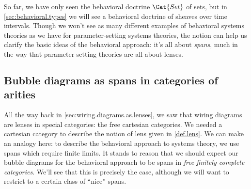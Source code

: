 \documentclass[DynamicalBook]{subfiles}
\begin{document}
So far, we have only seen the behavioral doctrine $\Cat{Set}$ of sets, but in
\cref{sec:behavioral.types} we will see a behavioral doctrine of sheaves over
time intervals. Though we won't see as many different examples of behavioral
systems theories as we have for parameter-setting systems theories, the notion can help us
clarify the basic ideas of the behavioral approach: it's all about \emph{spans},
much in the way that parameter-setting theories are all about lenses.

\subsection{Bubble diagrams as spans in categories of arities}\label{sec:behavioral.diagrams}


All the way back in \cref{sec:wiring.diagrams.as.lenses}, we saw that wiring
diagrams are lenses in special categories: the free cartesian categories. We
needed a cartesian category to describe the notion of lens given in
\cref{def.lens}. We can make an analogy here: to describe the behavioral
approach to systems theory, we use spans which require finite limits. It stands
to reason that we should expect our bubble diagrams for the behavioral approach
to be spans in \emph{free finitely complete categories}. We'll see that this is
precisely the case, although we will want to restrict to a certain class of
``nice'' spans.
\end{document}
